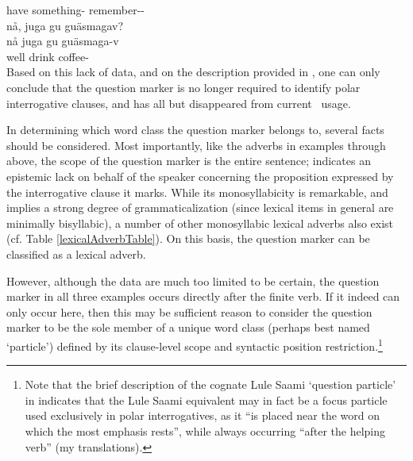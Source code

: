 	have\BS{}   something- remember--\\\nopagebreak
{}  %
\z
\ea\label{Qpart3}
\glll	nå, juga gu guäsmagav?\\
	nå juga gu guäsmaga-v\\
	well drink\BS{}  coffee-\\\nopagebreak
{} %
\z
Based on this lack of data, and on the description provided in \citet{Lagercrantz1926}, 
one can only conclude that the question marker is no longer required to identify polar interrogative clauses, and has all but disappeared from current \PS\ usage. %

In determining which word class the question marker belongs to, several facts should be considered. %
Most importantly, like the adverbs in examples  through  above, the scope of the question marker is the entire sentence; \TILDE{} indicates an epistemic lack on behalf of the speaker concerning the proposition expressed by the interrogative clause it marks. While its monosyllabicity is remarkable, and implies a strong degree of grammaticalization (since lexical items in general are minimally bisyllabic), a number of other monosyllabic lexical adverbs also exist (cf. Table \vref{lexicalAdverbTable}). On this basis, the question marker can be classified as a lexical adverb. 

However, although the data are much too limited to be certain, the question marker in all three examples occurs directly after the finite verb. If it indeed can only occur here, then this may be sufficient reason to consider the question marker to be the sole member of a unique word class (perhaps best named ‘particle’) defined by its clause-level scope and syntactic position restriction.\footnote{Note that the brief description of the cognate Lule Saami ‘question particle’ in \mbox{\citet[95]{Spiik1989}} indicates that the Lule Saami equivalent may in fact be a focus particle used exclusively in polar interrogatives, as it “is placed near the word on which the most emphasis rests”, while always occurring “after the helping verb” (my translations).} %




